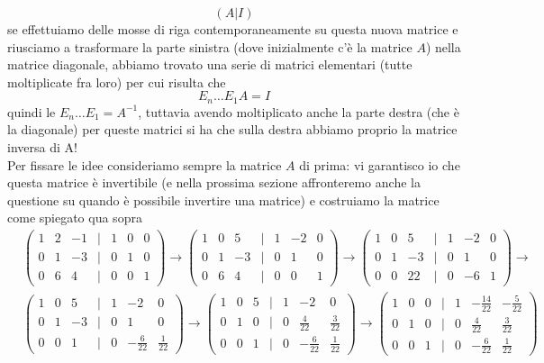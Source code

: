 $$
  (A | I)
$$
se effettuiamo delle mosse di riga contemporaneamente su questa nuova matrice e riusciamo a trasformare la parte sinistra (dove inizialmente c'è la matrice $A$) nella matrice diagonale, abbiamo trovato una serie di matrici elementari (tutte moltiplicate fra loro) per cui risulta che
$$
  E_n \dots E_1 A = I
$$
quindi le $E_n \ldots E_1 = A^{-1}$, tuttavia avendo moltiplicato anche la parte destra (che è la diagonale) per queste matrici si ha che sulla destra abbiamo proprio la matrice inversa di A! \\
Per fissare le idee consideriamo sempre la matrice $A$ di prima: vi garantisco io che questa matrice è invertibile (e nella prossima sezione affronteremo anche la questione su quando è possibile invertire una matrice) e costruiamo la matrice come spiegato qua sopra
\begin{align}
  &\begin{pmatrix}
      1 & 2 & -1 & | & 1 & 0 & 0 \\
      0 & 1 & -3 & | & 0 & 1 & 0 \\
      0 & 6 & 4 &  | & 0 & 0 & 1
    \end{pmatrix} \rightarrow 
    \begin{pmatrix}
      1 & 0 & 5 & | & 1 & -2 & 0 \\
      0 & 1 & -3 & | & 0 & 1 & 0 \\
      0 & 6 & 4 &  | & 0 & 0 & 1
    \end{pmatrix} \rightarrow
    \begin{pmatrix}
      1 & 0 & 5 & | & 1 & -2 & 0 \\
      0 & 1 & -3 & | & 0 & 1 & 0 \\
      0 & 0 & 22 &  | & 0 & -6 & 1
    \end{pmatrix} \rightarrow \\
    &\begin{pmatrix}
      1 & 0 & 5 & | & 1 & -2 & 0 \\
      0 & 1 & -3 & | & 0 & 1 & 0 \\
      0 & 0 & 1 &  | & 0 & -\frac{6}{22} & \frac{1}{22}
    \end{pmatrix} \rightarrow
    \begin{pmatrix}
      1 & 0 & 5 & | & 1 & -2 & 0 \\
      0 & 1 & 0 & | & 0 & \frac{4}{22} & \frac{3}{22} \\
      0 & 0 & 1 &  | & 0 & -\frac{6}{22} & \frac{1}{22}
    \end{pmatrix} \rightarrow
    \begin{pmatrix}
      1 & 0 & 0 & | & 1 & -\frac{14}{22} & -\frac{5}{22} \\
      0 & 1 & 0 & | & 0 & \frac{4}{22} & \frac{3}{22} \\
      0 & 0 & 1 &  | & 0 & -\frac{6}{22} & \frac{1}{22}
    \end{pmatrix}
\end{align}

